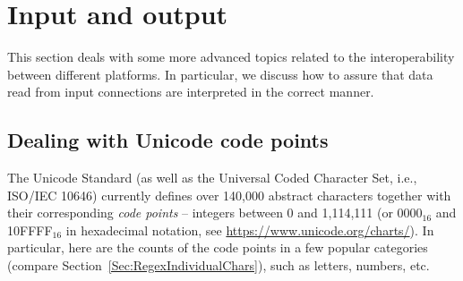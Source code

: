 \documentclass[nojss]{jss}
\begin{document}










\section{Input and output}\label{Sec:io}

This section deals with some more advanced topics related to the
interoperability
between different platforms. In particular, we discuss
how to assure that data read from input connections are interpreted
in the correct manner.



\subsection{Dealing with Unicode code points}\label{Sec:codepoints}

The Unicode Standard (as well as the
Universal Coded Character Set, i.e., ISO/IEC 10646)
currently defines over 140{,}000 abstract characters together with
their corresponding \textit{code points} -- integers
between 0 and 1{,}114{,}111 (or 0000${}_{16}$ and 10FFFF${}_{16}$
in hexadecimal notation, see \url{https://www.unicode.org/charts/}).
In particular, here are the counts of the code points in
a few popular categories (compare Section~\ref{Sec:RegexIndividualChars}),
such as letters, numbers, etc.
\end{document}
